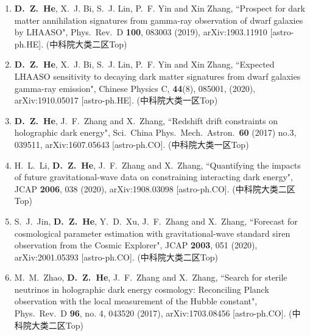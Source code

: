   \begin{enumerate}[leftmargin=*]    
    \item \textbf{D.~Z.~He}, X.~J. Bi, S.~J. Lin, P.~F. Yin and Xin Zhang, ``Prospect for dark matter annihilation signatures from gamma-ray observation of dwarf galaxies by LHAASO", Phys.\ Rev.\ D {\bf 100}, 083003 (2019), arXiv:1903.11910 [astro-ph.HE]. (中科院大类二区Top)
    
    \item \textbf{D.~Z.~He}, X.~J. Bi, S.~J. Lin, P.~F. Yin and Xin Zhang, ``Expected LHAASO sensitivity to decaying dark matter signatures from dwarf galaxies gamma-ray emission", Chinese Physics C, {\bf 44}(8), 085001, (2020), arXiv:1910.05017 [astro-ph.HE]. (中科院大类一区Top)
          
    \item \textbf{D.~Z.~He}, J.~F.~Zhang and X.~Zhang, ``Redshift drift constraints on holographic dark energy", Sci.\ China Phys.\ Mech.\ Astron.\  {\bf 60} (2017) no.3, 039511, arXiv:1607.05643 [astro-ph.CO]. (中科院大类一区Top)

    \item H.~L.~Li, \textbf{D.~Z.~He}, J.~F.~Zhang and X.~Zhang, ``Quantifying the impacts of future gravitational-wave data on constraining interacting dark energy", JCAP {\bf 2006}, 038 (2020), arXiv:1908.03098 [astro-ph.CO]. (中科院大类二区Top)

   \item S.~J.~Jin, \textbf{D.~Z.~He}, Y.~D.~Xu, J.~F.~Zhang and X.~Zhang, ``Forecast for cosmological parameter estimation with gravitational-wave standard siren observation from the Cosmic Explorer", JCAP {\bf 2003}, 051 (2020), arXiv:2001.05393 [astro-ph.CO]. (中科院大类二区Top)

    \item  M.~M.~Zhao, \textbf{D.~Z.~He}, J.~F.~Zhang and X.~Zhang, ``Search for sterile neutrinos in holographic dark energy cosmology: Reconciling Planck observation with the local measurement of the Hubble constant", Phys.\ Rev.\ D {\bf 96}, no. 4, 043520 (2017), arXiv:1703.08456 [astro-ph.CO]. (中科院大类二区Top)         


\end{enumerate}
